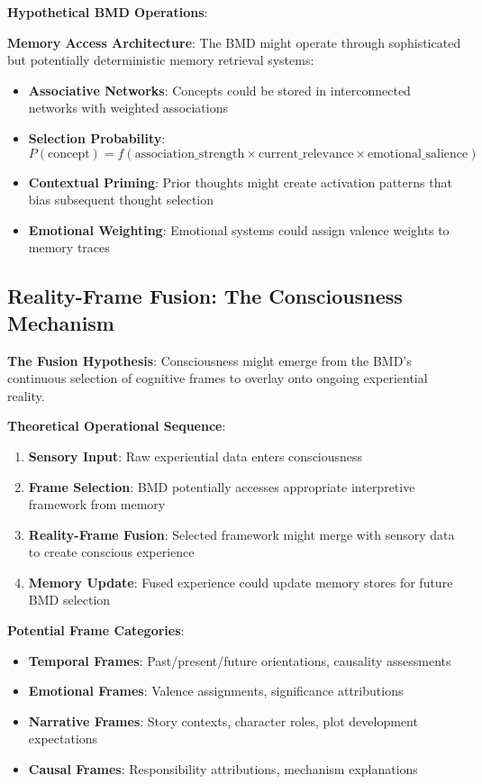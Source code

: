 \documentclass[12pt]{article}
\begin{document}
\textbf{Hypothetical BMD Operations}:

\textbf{Memory Access Architecture}:
The BMD might operate through sophisticated but potentially deterministic memory retrieval systems:

\begin{itemize}
\item \textbf{Associative Networks}: Concepts could be stored in interconnected networks with weighted associations
\item \textbf{Selection Probability}: $P(\text{concept}) = f(\text{association\_strength} \times \text{current\_relevance} \times \text{emotional\_salience})$
\item \textbf{Contextual Priming}: Prior thoughts might create activation patterns that bias subsequent thought selection
\item \textbf{Emotional Weighting}: Emotional systems could assign valence weights to memory traces
\end{itemize}

\subsection{Reality-Frame Fusion: The Consciousness Mechanism}

\textbf{The Fusion Hypothesis}: Consciousness might emerge from the BMD's continuous selection of cognitive frames to overlay onto ongoing experiential reality.

\textbf{Theoretical Operational Sequence}:
\begin{enumerate}
\item \textbf{Sensory Input}: Raw experiential data enters consciousness
\item \textbf{Frame Selection}: BMD potentially accesses appropriate interpretive framework from memory
\item \textbf{Reality-Frame Fusion}: Selected framework might merge with sensory data to create conscious experience
\item \textbf{Memory Update}: Fused experience could update memory stores for future BMD selection
\end{enumerate}

\textbf{Potential Frame Categories}:
\begin{itemize}
\item \textbf{Temporal Frames}: Past/present/future orientations, causality assessments
\item \textbf{Emotional Frames}: Valence assignments, significance attributions
\item \textbf{Narrative Frames}: Story contexts, character roles, plot development expectations
\item \textbf{Causal Frames}: Responsibility attributions, mechanism explanations
\end{itemize}
\end{document}
